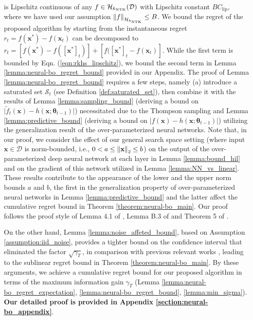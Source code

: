 is Lipschitz continuous of any $f \in \mathcal{H}_{k_\textup{NTK}}(\mathcal{D})$ with Lipschitz constant $B C_{\text{lip}}$, where we have used our assumption $\norm{f}_{\mathcal{H}_{k_\textup{NTK}}} \leq B$. We bound the regret of the proposed algorithm by starting from the instantaneous regret $r_t = f(\mathbf{x}^*) - f(\mathbf{x}_t)$ can be decomposed to $r_t = [f(\mathbf{x}^*) - f([\mathbf{x}^*]_t)] + [f([\mathbf{x}^*]_t - f(\mathbf{x}_t)]$. While the first term is bounded by Eqn. (\ref{eqn:rkhs_lipschitz}),  we bound the second term in Lemma \ref{lemma:neural-bo_regret_bound} provided in our Appendix. The proof of Lemma \ref{lemma:neural-bo_regret_bound} requires a few steps, namely (a) introduce a saturated set $\mathcal S_t$ (see Definition \ref{def:saturated_set}), then combine it with the results of Lemma \ref{lemma:sampling_bound} (deriving a bound on $\lvert \widetilde{f}_t(\mathbf{x}) - h(\mathbf{x}; \boldsymbol{\theta}_{t-1}) \rvert$) necessitated due to the Thompson sampling and Lemma \ref{lemma:predictive_bound} (deriving a bound on $\lvert f(\mathbf{x}) - h(\mathbf{x}; \boldsymbol{\theta}_{t-1}) \rvert$) utilizing the generalization result of the over-parameterized neural networks. Note that, in our proof, we consider the effect of our general search space setting (where input $\mathbf{x} \in \mathcal{D}$ is norm-bounded, i.e.,  $0 < a \le \norm{\mathbf{x}}_2 \le b$) on the output of the over-parameterized deep neural network at each layer in Lemma \ref{lemma:bound_hil} and on the gradient of this network utilized in Lemma \ref{lemma:NN_vs_linear}. These results contribute to the appearance of the lower and the upper norm bounds $a$ and $b$, the first in the generalization property of over-parameterized neural networks in Lemma \ref{lemma:predictive_bound} and the latter affect the cumulative regret bound in Theorem \ref{theorem:neural-bo_main}. Our proof follows the proof style of Lemma 4.1 of \citet{cao2019generalization}, Lemma B.3 of \citet{cao2019generalization} and Theorem 5 
of \citet{allen2019convergence}. 

On the other hand, Lemma \ref{lemma:noise_affeted_bound}, based on Assumption \ref{assumption:iid_noise}, provides a tighter bound on the confidence interval that eliminated the factor $\sqrt{\gamma_T}$, in comparison with previous relevant works \citet{chowdhury2017kernelized, zhou2020neural}, leading to the sublinear regret bound in Theorem \ref{theorem:neural-bo_main}.   
By these arguments, we achieve a cumulative regret bound for our proposed algorithm in terms of the maximum information gain $\gamma_T$ (Lemma \ref{lemma:neural-bo_regret_expectation}, \ref{lemma:neural-bo_regret_bound}, \ref{lemma:min_sigma}). \textbf{Our detailed proof is provided in Appendix \ref{section:neural-bo_appendix}}.

